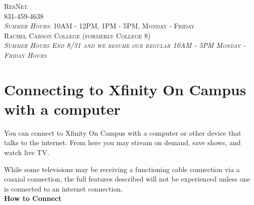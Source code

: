 \documentclass[a4paper, 11pt]{article}
\begin{document}
\begin{titlepage}
	{\scshape ResNet \\ 831-459-4638 \\
          \textit{Summer Hours}: 10AM - 12PM, 1PM - 5PM, Monday - Friday \\
          Rachel Carson College (formerly College 8) \\
          \vfill
          \vfill
          \vfill
          \textit{Summer Hours End 8/31 and we resume our regular 10AM - 5PM Monday - Friday
                  Hours}
          
  } %
	
	\vfill %
	

\end{titlepage}




\section*{
  Connecting to Xfinity On Campus with a computer
}

You can connect to Xfinity On Campus with a computer or other device that
talks to the internet.  From here you may stream on demand, save shows, and 
watch live TV. 

While some televisions may be receiving a functioning cable connection via
a coaxial connection, the full features described will not be 
experienced unless one is connected to an internet connection.\\
{\newline}
\textbf{How to Connect}
\end{document}
